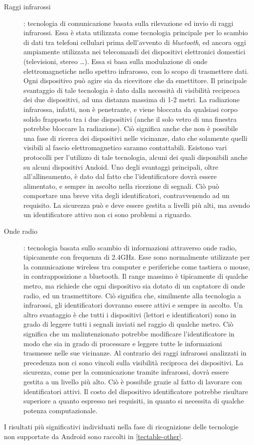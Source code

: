 \documentclass[a4paper,12pt]{report}
\begin{document}
\begin{description}
	\item[Raggi infrarossi]: tecnologia di comunicazione basata sulla rilevazione ed invio di raggi infrarossi. Essa è stata utilizzata come tecnologia principale per lo scambio di dati tra telefoni cellulari prima dell'avvento di \emph{bluetooth}, ed ancora oggi ampiamente utilizzata nei telecomandi dei dispositivi elettronici domestici (televisioni, stereo \dots). Essa si basa sulla modulazione di onde elettromagnetiche nello spettro infrarosso, con lo scopo di trasmettere dati. Ogni dispositivo può agire sia da ricevitore che da emettitore. Il principale svantaggio di tale tecnologia è dato dalla necessità di visibilità reciproca dei due dispositivi, ad una distanza massima di 1-2 metri. La radiazione infrarossa, infatti, non è penetrante, e viene bloccata da qualsiasi corpo solido frapposto tra i due dispositivi (anche il solo vetro di una finestra potrebbe bloccare la radiazione). Ciò significa anche che non è possibile una fase di ricerca dei dispositivi nelle vicinanze, dato che solamente quelli visibili al fascio elettromagnetico saranno contattabili. Esistono vari protocolli per l'utilizzo di tale tecnologia, alcuni dei quali disponibili anche su alcuni dispositivi Andoid. Uno degli svantaggi principali, oltre all'allineamento, è dato dal fatto che l'identificatore dovrà essere alimentato, e sempre in ascolto nella ricezione di segnali. Ciò può comportare una breve vita degli identificatori, contravvenendo ad un requisito. La sicurezza può e deve essere gestita a livelli più alti, ma avendo un identificatore attivo non ci sono problemi a riguardo. 
	
	\item[Onde radio]: tecnologia basata sullo scambio di informazioni attraverso onde radio, tipicamente con frequenza di 2.4GHz. Esse sono normalmente utilizzate per la comunicazione wireless tra computer e periferiche come tastiera o mouse, in contrapposizione a bluetooth. Il range massimo è tipicamente di qualche metro, ma richiede che ogni dispositivo sia dotato di un captatore di onde radio, ed un trasmettitore. Ciò significa che, similmente alla tecnologia a infrarossi, gli identificatori dovranno essere attivi e sempre in ascolto. Un altro svantaggio è che tutti i dispositivi (lettori e identificatori) sono in grado di leggere tutti i segnali inviati nel raggio di qualche metro. Ciò significa che un malintenzionato potrebbe modificare l'identificatore in modo che sia in grado di processare e leggere tutte le informazioni trasmesse nelle sue vicinanze. Al contrario dei raggi infrarossi analizzati in precedenza non ci sono vincoli sulla visibilità reciproca dei dispositivi. La sicurezza, come per la comunicazione tramite infrarossi, dovrà essere gestita a un livello più alto. Ciò è possibile grazie al fatto di lavorare con identificatori attivi. Il costo del dispositivo identificatore potrebbe risultare superiore a quanto espresso nei requisiti, in quanto si necessita di qualche potenza computazionale. 
\end{description}
I risultati più significativi individuati nella fase di ricognizione delle tecnologie non supportate da Android sono raccolti in \autoref{tectable-other}.
\end{document}

